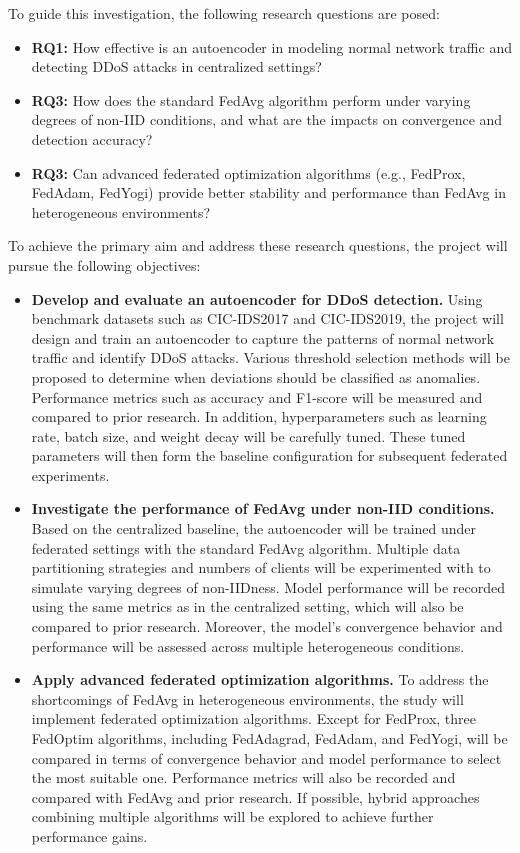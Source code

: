 To guide this investigation, the following research questions are posed:

\begin{itemize}
    \item \textbf{RQ1:} How effective is an autoencoder in modeling normal network traffic and detecting DDoS attacks in centralized settings?
    \item \textbf{RQ3:} How does the standard FedAvg algorithm perform under varying degrees of non-IID conditions, and what are the impacts on convergence and detection accuracy?
    \item \textbf{RQ3:} Can advanced federated optimization algorithms (e.g., FedProx, FedAdam, FedYogi) provide better stability and performance than FedAvg in heterogeneous environments?
\end{itemize}

To achieve the primary aim and address these research questions, the project will pursue the following objectives:

\begin{itemize}
    \item \textbf{Develop and evaluate an autoencoder for DDoS detection.} Using benchmark datasets such as CIC-IDS2017 and CIC-IDS2019, the project will design and train an autoencoder to capture the patterns of normal network traffic and identify DDoS attacks. Various threshold selection methods will be proposed to determine when deviations should be classified as anomalies. Performance metrics such as accuracy and F1-score will be measured and compared to prior research. In addition, hyperparameters such as learning rate, batch size, and weight decay will be carefully tuned. These tuned parameters will then form the baseline configuration for subsequent federated experiments.
    \item \textbf{Investigate the performance of FedAvg under non-IID conditions.} Based on the centralized baseline, the autoencoder will be trained under federated settings with the standard FedAvg algorithm. Multiple data partitioning strategies and numbers of clients will be experimented with to simulate varying degrees of non-IIDness. Model performance will be recorded using the same metrics as in the centralized setting, which will also be compared to prior research. Moreover, the model's convergence behavior and performance will be assessed across multiple heterogeneous conditions.
    \item \textbf{Apply advanced federated optimization algorithms.} To address the shortcomings of FedAvg in heterogeneous environments, the study will implement federated optimization algorithms. Except for FedProx, three FedOptim algorithms, including FedAdagrad, FedAdam, and FedYogi, will be compared in terms of convergence behavior and model performance to select the most suitable one. Performance metrics will also be recorded and compared with FedAvg and prior research. If possible, hybrid approaches combining multiple algorithms will be explored to achieve further performance gains.
\end{itemize}

